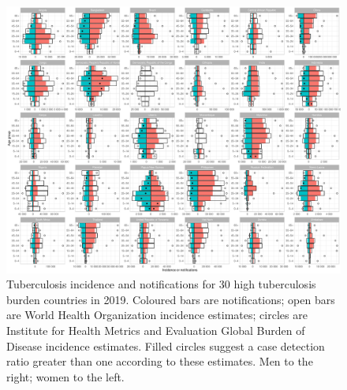 \documentclass[12pt]{article}
\begin{document}
\begin{figure}
\centering
\includegraphics[width=1\textwidth]{../plots/aF1.pdf}
\caption[Incidence and notifications for 30 countries]{Tuberculosis incidence and
  notifications for 30 high tuberculosis burden countries in 2019.
  Coloured bars are notifications; open bars are World Health Organization incidence estimates; circles are Institute for Health Metrics
  and Evaluation Global Burden of Disease incidence estimates. Filled circles suggest a case detection ratio greater than one according to these estimates. Men to the right; women to the left.}
\end{figure}


\FloatBarrier




\FloatBarrier
\end{document}
